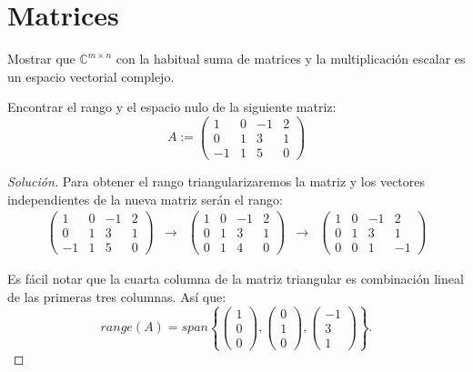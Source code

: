 \documentclass[12pt]{book}
\newcommand{\C}{\mathbb{C}}
\newenvironment{solution}
  {\renewcommand\qedsymbol{$\square$}\begin{proof}[Solución]}
  {\end{proof}}
\begin{document}
\section{Matrices}
\exercise Mostrar que $\C^{m\times n}$ con la habitual suma de matrices y la multiplicación escalar es un espacio vectorial complejo.

\exercise Encontrar el rango y el espacio nulo de la siguiente matriz:
\[
A:=\begin{pmatrix}
1 & 0 & -1 & 2\\
0 & 1 & 3 & 1\\
-1 & 1 & 5 & 0
\end{pmatrix}
\]
\begin{solution} Para obtener el rango triangularizaremos la matriz y los vectores independientes de la nueva matriz serán el rango:
\begin{align*}
    \begin{pmatrix}
    1 & 0 & -1 & 2\\
0 & 1 & 3 & 1\\
-1 & 1 & 5 & 0
\end{pmatrix} & \rightarrow & \begin{pmatrix}
1 & 0 & -1 & 2\\
0 & 1 & 3 & 1\\
0 & 1 & 4 & 0
\end{pmatrix} & \rightarrow & \begin{pmatrix}
1 & 0 & -1 & 2\\
0 & 1 & 3 & 1\\
0 & 0 & 1 & -1
\end{pmatrix}
\end{align*}

Es fácil notar que la cuarta columna de la matriz triangular es combinación lineal de las primeras tres columnas. Así que:
\[
range(A)=span\left\{\begin{pmatrix}
1\\
0\\
0
\end{pmatrix}, \begin{pmatrix}
0\\
1\\
0
\end{pmatrix}, \begin{pmatrix}
-1\\
3\\
1
\end{pmatrix}\right\}.
\]


\end{solution}
\end{document}
